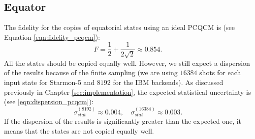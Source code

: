 \subsection{Equator}
The fidelity for the copies of equatorial states using an ideal PCQCM is (see Equation \ref{eqn:fidelity_pcqcm}):
\[
  F=\frac{1}{2}+\frac{1}{2\sqrt{2}}\approx0.854.
\]
All the states should be copied equally well. However, we still expect a dispersion of the results because of the finite sampling (we are using $16384$ shots for each input state for Starmon-5 and $8192$ for the IBM backends).
As discussed previously in Chapter \ref{sec:implementation}, the expected statistical uncertainty is (see \ref{eqn:dispersion_pcqcm}):
\[
    \sigma_{stat}^{(8192)}\approx 0.004, \quad \sigma_{stat}^{(16384)}\approx 0.003.
\]
If the dispersion of the results is significantly greater than the expected one, it means that the states are not copied equally well.

